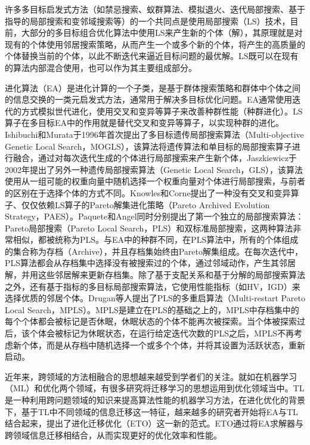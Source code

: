 \par
许多多目标启发式方法（如禁忌搜索\cite{ulungu1999mosa}、蚁群算法\cite{garcia2004empirical}、模拟退火\cite{bandyopadhyay2008simulated}、迭代局部搜索\cite{paquete2009design}、基于指导的局部搜索\cite{alsheddy2010guided}和变邻域搜索\cite{liang2010multi}等）的一个共同点是使用局部搜索（LS）技术，目前，大部分的多目标组合优化算法中使用LS来产生新的个体（解），其原理就是对现有的个体使用邻居搜索策略，从而产生一个或多个新的个体，将产生的高质量的个体替换当前的个体，以此不断迭代来逼近目标问题的最优解。LS既可以在现有的算法内部混合使用，也可以作为其主要组成部分。
\par
进化算法（EA）是进化计算的一个子类，是基于群体搜索策略和群体中个体之间的信息交换的一类元启发式方法，通常用于解决多目标优化问题。EA通常使用迭代的方式模拟世代进化，使用交叉和变异等算子来改善种群性能（种群进化）。LS算子在多目标EA中的作用就是替代交叉和变异等算子，以实现种群的进化。Ishibuchi和Murata于1996年首次提出了多目标遗传局部搜索算法（Multi-objective Genetic Local Search，MOGLS）\cite{ishibuchi1996multi}，该算法将遗传算法和单目标的局部搜索算子进行融合，通过对每次迭代生成的个体进行局部搜索来产生新个体，Jaszkiewicz于2002年提出了另外一种遗传局部搜索算法（Genetic Local Search，GLS）\cite{jaszkiewicz2002genetic}，该算法使用从一组可能的权重向量中随机选择一个权重向量对个体进行局部搜索，与前者的区别在于选择个体的方式不同。Knowles和Corne提出了一种没有交叉和变异算子、仅仅依赖LS算子的Pareto解集进化策略（Pareto Archived Evolution Strategy，PAES）\cite{knowles1999pareto,knowles2000approximating}。Paquete\cite{paquete2004pareto}和Angel\cite{angel2004approximating}同时分别提出了第一个独立的局部搜索算法：Pareto局部搜索（Pareto Local Search，PLS）和双标准局部搜索，这两种算法非常相似，都被统称为PLS。与EA中的种群不同，在PLS算法中，所有的个体组成的集合称为存档（Archive），并且存档集始终由Pareto解集组成。在每次迭代中，PLS算法都会从存档集中选择没有被搜索过的个体，通过邻域动作，产生其邻居解，并用这些邻居解来更新存档集。除了基于支配关系和基于分解的局部搜索算法之外，还有基于指标的多目标局部搜索算法\cite{basseur2007indicator}，它使用性能指标（如HV，IGD）来选择优质的邻居个体。Drugan等人提出了PLS的多重启算法（Multi-restart Pareto Local Search，MPLS）\cite{drugan2012stochastic}。MPLS是建立在PLS的基础之上的，MPLS中存档集中的每个个体都会被标记是否休眠，休眠状态的个体不能再次被探索。当个体被探索过后，该个体会被标记为休眠状态，在运行给定迭代次数的PLS之后，MPLS不再考虑新个体，而是从存档中随机选择一个或多个个体，并将其设置为活跃状态，重新启动。
\par
近年来，跨领域的方法相融合的思想越来越受到学者们的关注。就如在机器学习（ML）和优化两个领域，有很多研究将迁移学习的思想运用到优化领域当中。TL是一种利用跨问题领域的知识来提高算法性能的机器学习方法，在进化优化的背景下，基于TL中不同领域的信息迁移这一特征，越来越多的研究者开始将EA与TL结合起来，提出了进化迁移优化（ETO）这一新的范式。ETO通过将EA求解器与跨领域信息迁移相结合，从而实现更好的优化效率和性能。
